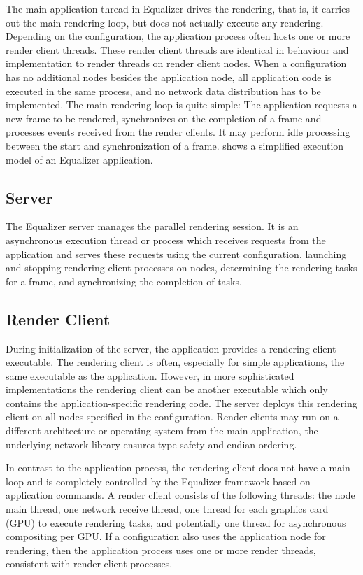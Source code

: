 The main application thread in Equalizer drives the rendering, that is, it
carries out the main rendering loop, but does not actually execute any
rendering. Depending on the configuration, the application process often hosts
one or more render client threads. These render client threads are identical in
behaviour and implementation to render threads on render client nodes. When a
configuration has no additional nodes besides the application node, all
application code is executed in the same process, and no network data
distribution has to be implemented. The main rendering loop is quite simple:
The application requests a new frame to be rendered, synchronizes on the
completion of a frame and processes events received from the render clients. It
may perform idle processing between the start and synchronization of a frame.
 shows a simplified execution model of an Equalizer
application.


\subsection{Server}

The Equalizer server manages the parallel rendering session. It is an
asynchronous execution thread or process which receives requests from the
application and serves these requests using the current configuration, launching
and stopping rendering client processes on nodes, determining the rendering
tasks for a frame, and synchronizing the completion of tasks.

\subsection{Render Client}

During initialization of the server, the application provides a rendering
client executable. The rendering client is often, especially for simple
applications, the same executable as the application. However, in more
sophisticated implementations the rendering client can be another executable
which only contains the application-specific rendering code. The server deploys
this rendering client on all nodes specified in the configuration. Render
clients may run on a different architecture or operating system from the main
application, the underlying network library ensures type safety and endian
ordering.

In contrast to the application process, the rendering client does not have a
main loop and is completely controlled by the Equalizer framework based on
application commands. A render client consists of the following threads: the
node main thread, one network receive thread, one thread for each graphics card
(GPU) to execute rendering tasks, and potentially one thread for asynchronous
compositing per GPU. If a configuration also uses the application node for
rendering, then the application process uses one or more render threads,
consistent with render client processes.

